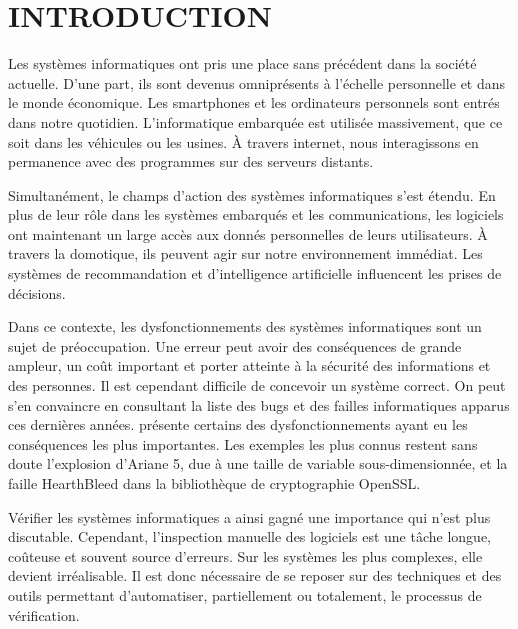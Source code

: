 
\chapter{INTRODUCTION}\label{sec:Introduction}  %

Les systèmes informatiques ont pris une place sans précédent dans la société
actuelle. D'une part, ils sont devenus omniprésents à l'échelle personnelle et
dans le monde économique. Les smartphones et les ordinateurs personnels sont
entrés dans notre quotidien. L'informatique embarquée est utilisée massivement,
que ce soit dans les véhicules ou les usines. À travers internet, nous
interagissons en permanence avec des programmes sur des serveurs distants.

Simultanément, le champs d'action des systèmes informatiques s'est étendu. En
plus de leur rôle dans les systèmes embarqués et les communications, les
logiciels ont maintenant un large accès aux donnés personnelles de leurs
utilisateurs. À travers la domotique, ils peuvent agir sur notre environnement
immédiat. Les systèmes de recommandation et d'intelligence artificielle
influencent les prises de décisions.

Dans ce contexte, les dysfonctionnements des systèmes informatiques sont un
sujet de préoccupation. Une erreur peut avoir des conséquences de grande
ampleur, un coût important et porter atteinte à la sécurité des informations et
des personnes. Il est cependant difficile de concevoir un système correct. On
peut s'en convaincre en consultant la liste des bugs et des failles
informatiques apparus ces dernières années. \cite{horror_story} présente
certains des dysfonctionnements ayant eu les conséquences les plus importantes.
Les exemples les plus connus restent sans doute l'explosion d'Ariane 5, due à
une taille de variable sous-dimensionnée, et la faille HearthBleed dans la
bibliothèque de cryptographie OpenSSL.

Vérifier les systèmes informatiques a ainsi gagné une importance qui n'est
plus discutable. Cependant, l'inspection manuelle des logiciels est une
tâche longue, coûteuse et souvent source d'erreurs. Sur les systèmes les
plus complexes, elle devient irréalisable. Il est donc nécessaire de se
reposer sur des techniques et des outils permettant d'automatiser,
partiellement ou totalement, le processus de vérification.

